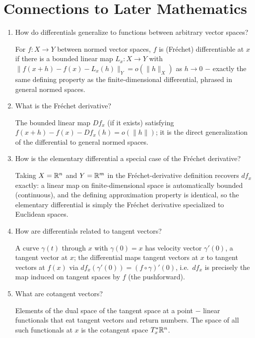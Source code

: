 \documentclass{self-check}
\begin{document}
\section{Connections to Later Mathematics}

\begin{enumerate}[resume, leftmargin=*, itemsep=8pt]

\item How do differentials generalize to functions between arbitrary vector spaces?
\begin{answer}
For \(f:X\to Y\) between normed vector spaces, \(f\) is (Fr\'echet) differentiable at \(x\) if there is a bounded linear map \(L_x:X\to Y\) with \(\|f(x+h)-f(x)-L_x(h)\|_Y=o(\|h\|_X)\) as \(h\to0\) \(-\) exactly the same defining property as the finite-dimensional differential, phrased in general normed spaces.
\end{answer}

\item What is the Fr\'echet derivative?
\begin{answer}
The bounded linear map \(Df_x\) (if it exists) satisfying \(f(x+h)-f(x)-Df_x(h)=o(\|h\|)\); it is the direct generalization of the differential to general normed spaces.
\end{answer}

\item How is the elementary differential a special case of the Fr\'echet derivative?
\begin{answer}
Taking \(X=\mathbb{R}^n\) and \(Y=\mathbb{R}^m\) in the Fr\'echet-derivative definition recovers \(df_x\) exactly: a linear map on finite-dimensional space is automatically bounded (continuous), and the defining approximation property is identical, so the elementary differential is simply the Fr\'echet derivative specialized to Euclidean spaces.
\end{answer}

\item How are differentials related to tangent vectors?
\begin{answer}
A curve \(\gamma(t)\) through \(x\) with \(\gamma(0)=x\) has velocity vector \(\gamma'(0)\), a tangent vector at \(x\); the differential maps tangent vectors at \(x\) to tangent vectors at \(f(x)\) via \(df_x(\gamma'(0))=(f\circ\gamma)'(0)\), i.e.\ \(df_x\) is precisely the map induced on tangent spaces by \(f\) (the pushforward).
\end{answer}

\item What are cotangent vectors?
\begin{answer}
Elements of the dual space of the tangent space at a point \(-\) linear functionals that eat tangent vectors and return numbers. The space of all such functionals at \(x\) is the cotangent space \(T_x^*\mathbb{R}^n\).
\end{answer}


\end{enumerate}
\end{document}
